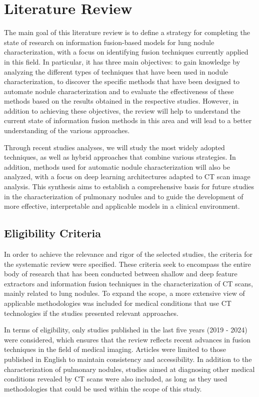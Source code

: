 \chapter{Literature Review} \label{chap:lreview}

The main goal of this literature review is to define a strategy for completing the state of research on information fusion-based models for lung nodule characterization, with a focus on identifying fusion techniques currently applied in this field. In particular, it has three main objectives: to gain knowledge by analyzing the different types of techniques that have been used in nodule characterization, to discover the specific methods that have been designed to automate nodule characterization and to evaluate the effectiveness of these methods based on the results obtained in the respective studies. However, in addition to achieving these objectives, the review will help to understand the current state of information fusion methods in this area and will lead to a better understanding of the various approaches.

Through recent studies analyses, we will study the most widely adopted techniques, as well as hybrid approaches that combine various strategies. In addition, methods used for automatic nodule characterization will also be analyzed, with a focus on deep learning architectures adapted to CT scan image analysis. This synthesis aims to establish a comprehensive basis for future studies in the characterization of pulmonary nodules and to guide the development of more effective, interpretable and applicable models in a clinical environment.

\section{Eligibility Criteria} \label{criteria} 

In order to achieve the relevance and rigor of the selected studies, the criteria for the systematic review were specified. These criteria seek to encompass the entire body of research that has been conducted between shallow and deep feature extractors and information fusion techniques in the characterization of CT scans, mainly related to lung nodules. To expand the scope, a more extensive view of applicable methodologies was included for medical conditions that use CT technologies if the studies presented relevant approaches.

In terms of eligibility, only studies published in the last five years (2019 - 2024) were considered, which ensures that the review reflects recent advances in fusion techniques in the field of medical imaging. Articles were limited to those published in English to maintain consistency and accessibility. In addition to the characterization of pulmonary nodules, studies aimed at diagnosing other medical conditions revealed by CT scans were also included, as long as they used methodologies that could be used within the scope of this study.

